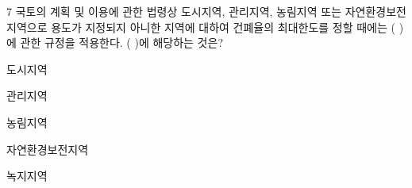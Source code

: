 \begin{question}{7}
국토의 계획 및 이용에 관한 법령상 도시지역, 관리지역, 농림지역 또는 자연환경보전지역으로 용도가 지정되지 아니한 지역에 대하여 건폐율의 최대한도를 정할 때에는 ( )에 관한 규정을 적용한다. ( )에 해당하는 것은?
\begin{choices}
  \item 도시지역
  \item 관리지역
  \item 농림지역
  \item 자연환경보전지역
  \item 녹지지역
\end{choices}
\end{question}
